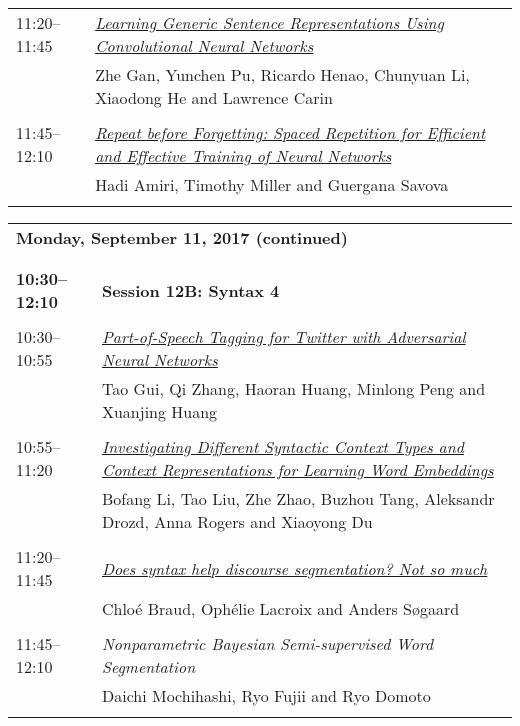 \begin{tabular}{p{20mm}p{128mm}}
11:20--11:45 & \hyperlink{page.2373}{\em Learning Generic Sentence Representations Using Convolutional Neural Networks}\\
         & Zhe Gan, Yunchen Pu, Ricardo Henao, Chunyuan Li, Xiaodong He and Lawrence Carin \\
\\

11:45--12:10 & \hyperlink{page.2384}{\em Repeat before Forgetting: Spaced Repetition for Efficient and Effective Training of Neural Networks}\\
         & Hadi Amiri, Timothy Miller and Guergana Savova \\
\\

\end{tabular}
\newpage
\begin{tabular}{p{20mm}p{128mm}}
\\
\multicolumn{2}{l}{\bf Monday, September 11, 2017 (continued)} \\\\
\\{\bf 10:30--12:10} & {\bf Session 12B: Syntax 4 } \\
\\
10:30--10:55 & \hyperlink{page.2394}{\em Part-of-Speech Tagging for Twitter with Adversarial Neural Networks}\\
         & Tao Gui, Qi Zhang, Haoran Huang, Minlong Peng and Xuanjing Huang \\
\\

10:55--11:20 & \hyperlink{page.2404}{\em Investigating Different Syntactic Context Types and Context Representations for Learning Word Embeddings}\\
         & Bofang Li, Tao Liu, Zhe Zhao, Buzhou Tang, Aleksandr Drozd, Anna Rogers and Xiaoyong Du \\
\\

11:20--11:45 & \hyperlink{page.2415}{\em Does syntax help discourse segmentation? Not so much}\\
         & Chlo\'{e} Braud, Oph\'{e}lie Lacroix and Anders S{\o}gaard \\
\\

11:45--12:10 & {\em Nonparametric Bayesian Semi-supervised Word Segmentation}\\
         & Daichi Mochihashi, Ryo Fujii and Ryo Domoto \\
\\


\end{tabular}
